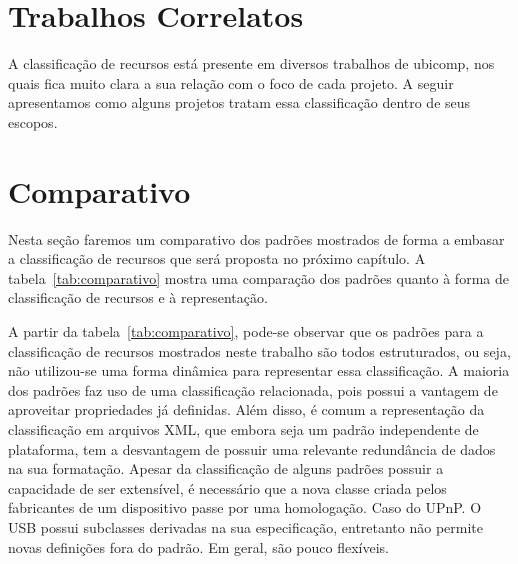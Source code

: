 






\section{Trabalhos Correlatos}
\label{sec:correlatos}

A classificação de recursos está presente em diversos trabalhos de ubicomp, nos quais fica muito clara a sua relação com o foco de cada projeto. A seguir apresentamos como alguns projetos tratam essa classificação dentro de seus escopos.






\section{Comparativo}
\label{sec:comparativo}

Nesta seção faremos um comparativo dos padrões mostrados de forma a embasar a classificação de recursos que será proposta no próximo capítulo. A tabela~\ref{tab:comparativo} mostra uma comparação dos padrões quanto à forma de classificação de recursos e à representação. 

A partir da tabela~\ref{tab:comparativo}, pode-se observar que os padrões para a classificação de recursos mostrados neste trabalho são todos estruturados, ou seja, não utilizou-se uma forma dinâmica para representar essa classificação. A maioria dos padrões faz uso de uma classificação relacionada, pois possui a vantagem de aproveitar propriedades já definidas. Além disso, é comum a representação da classificação em arquivos XML, que embora seja um padrão independente de plataforma, tem a desvantagem de possuir uma relevante redundância de dados na sua formatação. Apesar da classificação de alguns padrões possuir a capacidade de ser extensível, é necessário que a nova classe criada pelos fabricantes de um dispositivo passe por uma homologação. Caso do UPnP. O USB possui subclasses derivadas na sua especificação, entretanto não permite novas definições fora do padrão. Em geral, são pouco flexíveis. 

